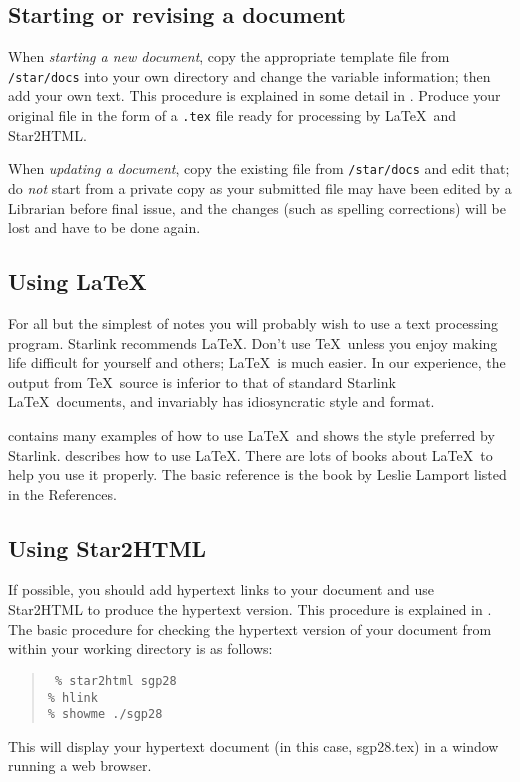 \subsection{Starting or revising a document}

When {\em starting a new document}, copy the appropriate template file from 
{\tt /star/docs}
into your own directory and change the variable information; then add your
own text.
This procedure is explained in some detail in
.
Produce your original file in the form of a {\tt .tex} file ready for
processing by \LaTeX\ and Star2HTML.

When {\em updating a document}, copy the existing file from {\tt /star/docs}
and edit that; do {\em not} start from a private copy as your submitted file
may have been edited by a Librarian before final issue, and the
changes (such as spelling corrections) will be lost and have to be done again.

\subsection{Using \LaTeX}

For all but the simplest of notes you will probably wish to use a text
processing program.
Starlink recommends {\LaTeX}.
Don't use \TeX\ unless you enjoy making life difficult for yourself and
others; \LaTeX\ is much easier.
In our experience, the output from \TeX\ source is inferior to that of
standard Starlink \LaTeX\ documents, and invariably has idiosyncratic style and
format.

contains many examples of how to use \LaTeX\ and shows the style preferred by
Starlink.
 describes how to use \LaTeX.
There are lots of books about \LaTeX\ to help you use it properly.
The basic reference is the book by Leslie Lamport listed in the References.

\subsection{Using Star2HTML}

If possible, you should add hypertext links to your document and use
Star2HTML to produce the hypertext version.
This procedure is explained in .
The basic procedure for checking the hypertext version of your document
from within your working directory is as follows:
\begin{quote}
{\tt
\% star2html sgp28\\
\% hlink\\
\% showme ./sgp28}
\end{quote}
This will display your hypertext document (in this case, sgp28.tex) in a window
running a web browser.


